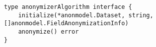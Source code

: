 \begin{lstlisting}[caption=The \texttt{anonymizerAlgorithm interfcae},label=lst:anon_interface,float,floatplacement=H]
type anonymizerAlgorithm interface {
	initialize(*anonmodel.Dataset, string, []anonmodel.FieldAnonymizationInfo)
	anonymize() error
}
\end{lstlisting}